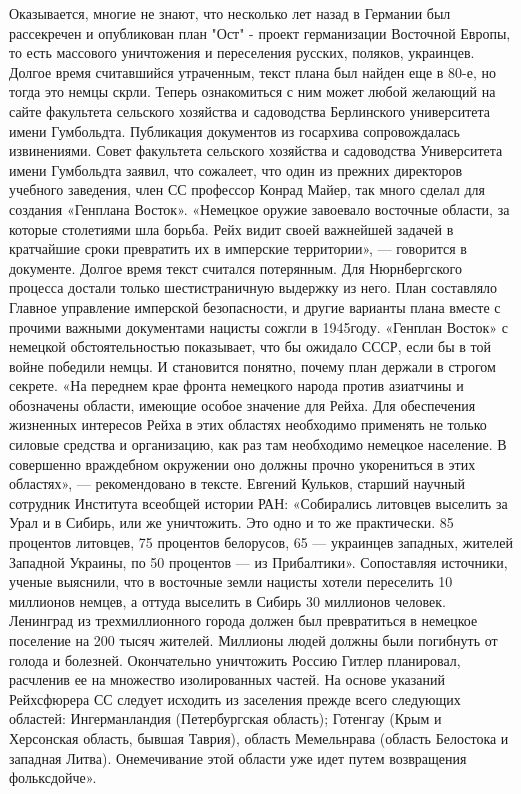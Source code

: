 Оказывается, многие не знают, что несколько лет назад в Германии был рассекречен и опубликован план "Ост" -  проект германизации Восточной Европы, то есть массового уничтожения и переселения русских, поляков, украинцев. Долгое время считавшийся утраченным, текст плана был найден еще в 80-е, но тогда это немцы скрли. Теперь ознакомиться с ним может любой желающий на сайте факультета сельского хозяйства и садоводства Берлинского университета имени Гумбольдта.
Публикация документов из госархива сопровождалась  извинениями. Совет факультета сельского хозяйства и садоводства Университета имени Гумбольдта заявил, что сожалеет, что один из прежних директоров учебного заведения, член СС профессор Конрад Майер, так много сделал для создания «Генплана Восток». 
«Немецкое оружие завоевало восточные области, за которые столетиями шла борьба. Рейх видит своей важнейшей задачей в кратчайшие сроки превратить их в имперские территории», — говорится в документе.
Долгое время текст считался потерянным. Для Нюрнбергского процесса достали только шестистраничную выдержку из него. План составляло Главное управление имперской безопасности, и другие варианты плана вместе с прочими важными документами нацисты сожгли в 1945году. «Генплан Восток» с немецкой обстоятельностью показывает, что бы ожидало СССР, если бы в той войне победили немцы. И становится понятно, почему план держали в строгом секрете.
«На переднем крае фронта немецкого народа против азиатчины и обозначены области, имеющие особое значение для Рейха. Для обеспечения жизненных интересов Рейха в этих областях необходимо применять не только силовые средства и организацию, как раз там необходимо немецкое население. В совершенно враждебном окружении оно должны прочно укорениться в этих областях», — рекомендовано в тексте.
Евгений Кульков, старший научный сотрудник Института всеобщей истории РАН: «Собирались литовцев выселить за Урал и в Сибирь, или же уничтожить. Это одно и то же практически. 85 процентов литовцев, 75 процентов белорусов, 65 — украинцев западных, жителей Западной Украины, по 50 процентов — из Прибалтики».
Сопоставляя источники, ученые выяснили, что в восточные земли нацисты хотели переселить 10 миллионов немцев, а оттуда выселить в Сибирь 30 миллионов человек. Ленинград из трехмиллионного города должен был превратиться в немецкое поселение на 200 тысяч жителей. Миллионы людей должны были погибнуть от голода и болезней. Окончательно уничтожить Россию Гитлер планировал, расчленив ее на множество изолированных частей.
На основе указаний Рейхсфюрера СС следует исходить из заселения прежде всего следующих областей: Ингерманландия (Петербургская область); Готенгау (Крым и Херсонская область, бывшая Таврия), область Мемельнрава (область Белостока и западная Литва). Онемечивание этой области уже идет путем возвращения фольксдойче».
